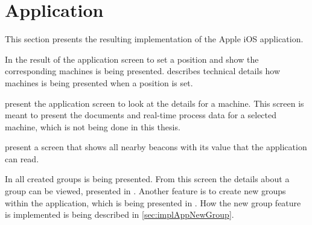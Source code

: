 \section{Application}\label{sec:resultApp}
This section presents the resulting implementation of the Apple iOS application.

\bigskip

In  the result of the application screen to set a position and show the corresponding machines is being presented.
 describes technical details how machines is being presented when a position is set.

\bigskip

 present the application screen to look at the details for a machine.
This screen is meant to present the documents and real-time process data for a selected machine, which is not being done in this thesis. 

\bigskip

 present a screen that shows all nearby beacons with its value that the application can read.

\bigskip

In  all created groups is being presented.
From this screen the details about a group can be viewed, presented in .
Another feature is to create new groups within the application, which is being presented in .
How the new group feature is implemented is being described in \cref{sec:implAppNewGroup}.

